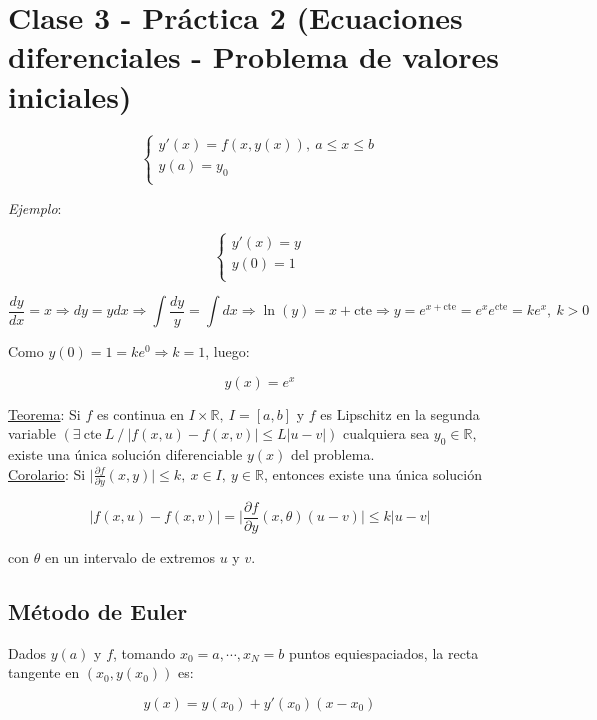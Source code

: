 \section{Clase 3 - Pr\'actica 2 (Ecuaciones diferenciales - Problema de valores iniciales)}

$$ 
	\begin{cases}
        y'(x) = f(x, y(x)), \ a \leq x \leq b\\
        y(a) = y_{0}\\
    \end{cases}
$$

\textit{Ejemplo}:

$$ 
	\begin{cases}
        y'(x) = y\\
        y(0) = 1\\
    \end{cases}
$$

$$\frac{dy}{dx} = x \Rightarrow dy = ydx \Rightarrow \int \frac{dy}{y} = \int dx \Rightarrow \ln(y) = x + \text{cte} \Rightarrow y = e^{x + \text{cte}} = e^{x}e^{\text{cte}} = ke^{x},\ k > 0$$

Como $y(0) = 1 = ke^{0} \Rightarrow k = 1$, luego:

$$y(x) = e^{x}$$

\underline{Teorema}: Si $f$ es continua en $I \times \mathbb{R},\ I = [a, b]$ y $f$ es Lipschitz en la segunda variable $(\exists \ \text{cte}\ L\ / \ |f(x, u) - f(x, v)| \leq L|u - v|)$ cualquiera sea $y_{0} \in \mathbb{R}$, existe una \'unica soluci\'on diferenciable $y(x)$ del problema.\\

\underline{Corolario}: Si $\bigg|\frac{\partial f}{\partial y}(x, y)\bigg| \leq k,\ x \in I,\ y \in \mathbb{R}$, entonces existe una \'unica soluci\'on

$$|f(x, u) - f(x, v)| = \bigg|\frac{\partial f}{\partial y}(x, \theta)(u - v)\bigg| \leq k|u - v|$$

con $\theta$ en un intervalo de extremos $u$ y $v$.\\

\subsection{M\'etodo de Euler}

Dados $y(a)$ y $f$, tomando $x_{0} = a, \cdots, x_{N} = b$ puntos equiespaciados, la recta tangente en $(x_{0}, y(x_{0}))$ es:

$$y(x) = y(x_{0}) + y'(x_{0})(x - x_{0})$$

